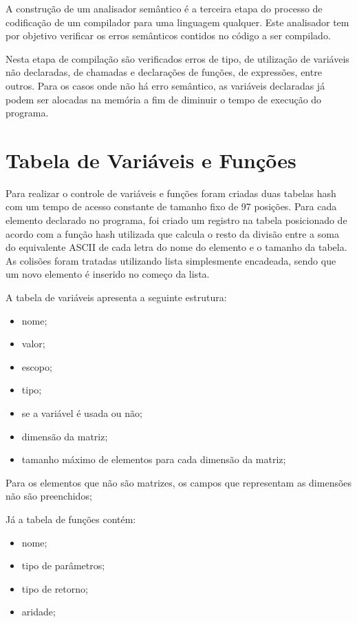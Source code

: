 \documentclass[
12pt,				%
a4paper,			%
english,			%
french,				%
spanish,			%
brazil,				%
article
]{abntex2}
\begin{document}
A construção de um analisador semântico é a terceira etapa do processo de codificação de um compilador para uma linguagem qualquer. Este analisador tem por objetivo verificar os erros semânticos contidos no código a ser compilado. 

Nesta etapa de compilação são verificados erros de tipo, de utilização de variáveis não declaradas, de chamadas e declarações de funções, de expressões, entre outros. Para os casos onde não há erro semântico, as variáveis declaradas já podem ser alocadas na memória a fim de diminuir o tempo de execução do programa.  

\section{Tabela de Variáveis e Funções}

Para realizar o controle de variáveis e funções foram criadas duas tabelas hash com um tempo de acesso constante de tamanho fixo de 97 posições. Para cada elemento declarado no programa, foi criado um registro na tabela posicionado de acordo com a função hash utilizada que calcula o resto da divisão entre a soma do equivalente ASCII de cada letra do nome do elemento e o tamanho da tabela. As colisões foram tratadas utilizando lista simplesmente encadeada, sendo que um novo elemento é inserido no começo da lista.

A tabela de variáveis apresenta a seguinte estrutura:

\begin{itemize}
	\item nome;
	\item valor;
	\item escopo;
	\item tipo;
	\item se a variável é usada ou não;
	\item dimensão da matriz;
	\item tamanho máximo de elementos para cada dimensão da matriz; 
\end{itemize}

Para os elementos que não são matrizes, os campos que representam as dimensões não são preenchidos;

Já a tabela de funções contém:

\begin{itemize}
	\item nome;
	\item tipo de parâmetros;
	\item tipo de retorno;
	\item aridade;
\end{itemize}
\end{document}
